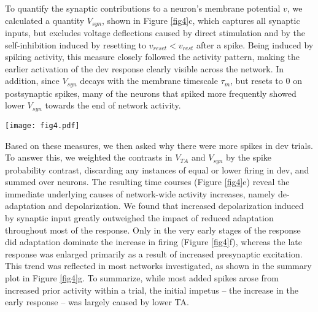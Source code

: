\documentclass[pdflatex,referee,iicol,sn-basic]{sn-jnl}
\theoremstyle{thmstyleone}%
\theoremstyle{thmstyletwo}%
\theoremstyle{thmstylethree}%
\begin{document}
To quantify the synaptic contributions to a neuron's membrane potential $v$, we calculated a quantity $V_{syn}$, shown in Figure \ref{fig4}c, which captures all synaptic inputs, but excludes voltage deflections caused by direct stimulation and by the self-inhibition induced by resetting to $v_{reset} < v_{rest}$ after a spike. Being induced by spiking activity, this measure closely followed the activity pattern, making the earlier activation of the dev response clearly visible across the network. In addition, since $V_{syn}$ decays with the membrane timescale $\tau_m$, but resets to $0$ on postsynaptic spikes, many of the neurons that spiked more frequently showed lower $V_{syn}$ towards the end of network activity.

\begin{figure*}%
    \centering
    \texttt{[image: fig4.pdf]}
    \caption{Responses and threshold adaptation in a TA-only ablation. \textbf{a, b, c} Post-stimulus histograms across target trials, showing trial time along the horizontal axis, and neurons along the vertical, sorted by the time of the first recorded spike across all trials and conditions. Left and middle column, target trials in dev and msc sequence, respectively; right column, contrast between these two. \textbf{d} Per-neuron relationship between the contrast (dev - msc) in $V_{TA}$ at the start of trials, and the contrast in average number of spikes fired, excluding inhibitory neurons, and associated linear regression (r = -0.424, p = 3.1e-36). \textbf{e} Contribution of $V_{TA}$ and $V_{syn}$ to bins with increased firing in dev (i.e., red bins in the spike probability contrast, \textbf{a}), weighted by that same contrast. \textbf{f} Contribution of $V_{TA}$ relative to the sum of the weighted contributions in \textbf{e}. \textbf{g} Relative contribution of $V_{TA}$ across networks, showing median (solid line) and inter-quartile range (shaded area).}
    \label{fig4}
\end{figure*}

Based on these measures, we then asked why there were more spikes in dev trials. To answer this, we weighted the contrasts in $V_{TA}$ and $V_{syn}$ by the spike probability contrast, discarding any instances of equal or lower firing in dev, and summed over neurons. The resulting time courses (Figure \ref{fig4}e) reveal the immediate underlying causes of network-wide activity increases, namely de-adaptation and depolarization. We found that increased depolarization induced by synaptic input greatly outweighed the impact of reduced adaptation throughout most of the response. Only in the very early stages of the response did adaptation dominate the increase in firing (Figure \ref{fig4}f), whereas the late response was enlarged primarily as a result of increased presynaptic excitation. This trend was reflected in most networks investigated, as shown in the summary plot in Figure \ref{fig4}g. To summarize, while most added spikes arose from increased prior activity within a trial, the initial impetus -- the increase in the early response -- was largely caused by lower TA.
\end{document}
